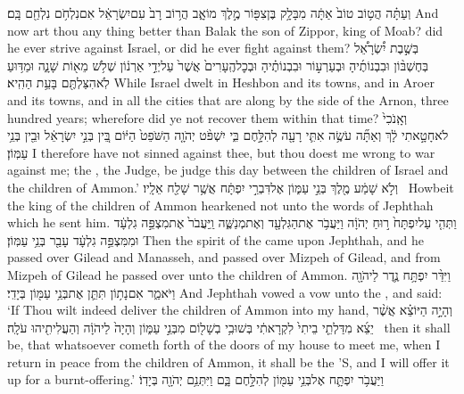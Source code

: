 {וְעַתָּ֗ה הֲט֥וֹב טוֹב֙ אַתָּ֔ה מִבָּלָ֥ק בֶּן\maqqaf צִפּ֖וֹר מֶ֣לֶךְ מוֹאָ֑ב הֲר֥וֹב רָב֙ עִם\maqqaf יִשְׂרָאֵ֔ל אִם\maqqaf נִלְחֹ֥ם נִלְחַ֖ם בָּֽם׃}
{And now art thou any thing better than Balak the son of Zippor, king of Moab? did he ever strive against Israel, or did he ever fight against them?}
{בְּשֶׁ֣בֶת יִ֠שְׂרָאֵ֠ל בְּחֶשְׁבּ֨וֹן וּבִבְנוֹתֶ֜יהָ וּבְעַרְע֣וֹר וּבִבְנוֹתֶ֗יהָ וּבְכׇל\maqqaf הֶֽעָרִים֙ אֲשֶׁר֙ עַל\maqqaf יְדֵ֣י אַרְנ֔וֹן שְׁלֹ֥שׁ מֵא֖וֹת שָׁנָ֑ה וּמַדּ֥וּעַ לֹֽא\maqqaf הִצַּלְתֶּ֖ם בָּעֵ֥ת הַהִֽיא׃}
{While Israel dwelt in Heshbon and its towns, and in Aroer and its towns, and in all the cities that are along by the side of the Arnon, three hundred years; wherefore did ye not recover them within that time?}
{וְאָֽנֹכִי֙ לֹא\maqqaf חָטָ֣אתִי לָ֔ךְ וְאַתָּ֞ה עֹשֶׂ֥ה אִתִּ֛י רָעָ֖ה לְהִלָּ֣חֶם בִּ֑י יִשְׁפֹּ֨ט יְהֹוָ֤ה הַשֹּׁפֵט֙ הַיּ֔וֹם בֵּ֚ין בְּנֵ֣י יִשְׂרָאֵ֔ל וּבֵ֖ין בְּנֵ֥י עַמּֽוֹן׃}
{I therefore have not sinned against thee, but thou doest me wrong to war against me; the \lord, the Judge, be judge this day between the children of Israel and the children of Ammon.’}
{וְלֹ֣א שָׁמַ֔ע מֶ֖לֶךְ בְּנֵ֣י עַמּ֑וֹן אֶל\maqqaf דִּבְרֵ֣י יִפְתָּ֔ח אֲשֶׁ֥ר שָׁלַ֖ח אֵלָֽיו׃ \petucha }
{Howbeit the king of the children of Ammon hearkened not unto the words of Jephthah which he sent him.}
{וַתְּהִ֤י עַל\maqqaf יִפְתָּח֙ ר֣וּחַ יְהֹוָ֔ה וַיַּעֲבֹ֥ר אֶת\maqqaf הַגִּלְעָ֖ד וְאֶת\maqqaf מְנַשֶּׁ֑ה וַֽיַּעֲבֹר֙ אֶת\maqqaf מִצְפֵּ֣ה גִלְעָ֔ד וּמִמִּצְפֵּ֣ה גִלְעָ֔ד עָבַ֖ר בְּנֵ֥י עַמּֽוֹן׃}
{Then the spirit of the \lord\space came upon Jephthah, and he passed over Gilead and Manasseh, and passed over Mizpeh of Gilead, and from Mizpeh of Gilead he passed over unto the children of Ammon.}
{וַיִּדַּ֨ר יִפְתָּ֥ח נֶ֛דֶר לַיהֹוָ֖ה וַיֹּאמַ֑ר אִם\maqqaf נָת֥וֹן תִּתֵּ֛ן אֶת\maqqaf בְּנֵ֥י עַמּ֖וֹן בְּיָדִֽי׃}
{And Jephthah vowed a vow unto the \lord, and said: ‘If Thou wilt indeed deliver the children of Ammon into my hand,}
{וְהָיָ֣ה הַיּוֹצֵ֗א אֲשֶׁ֨ר יֵצֵ֜א מִדַּלְתֵ֤י בֵיתִי֙ לִקְרָאתִ֔י בְּשׁוּבִ֥י בְשָׁל֖וֹם מִבְּנֵ֣י עַמּ֑וֹן וְהָיָה֙ לַיהֹוָ֔ה וְהַעֲלִיתִ֖יהוּ עֹלָֽה׃ \petucha }
{then it shall be, that whatsoever cometh forth of the doors of my house to meet me, when I return in peace from the children of Ammon, it shall be the \lord’S, and I will offer it up for a burnt-offering.’}
{וַיַּעֲבֹ֥ר יִפְתָּ֛ח אֶל\maqqaf בְּנֵ֥י עַמּ֖וֹן לְהִלָּ֣חֶם בָּ֑ם וַיִּתְּנֵ֥ם יְהֹוָ֖ה בְּיָדֽוֹ׃}
